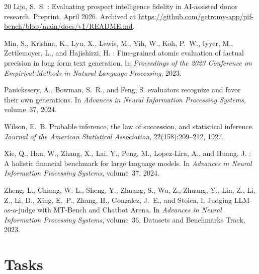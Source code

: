 \documentclass[11pt,a4paper]{article}
\begin{document}
\begin{thebibliography}{20}
Lijo, S.~S.
: Evaluating prospect intelligence fidelity in AI-assisted donor research.
\newblock Preprint, April 2026. Archived at \url{https://github.com/getromy-app/pif-bench/blob/main/docs/v1/README.md}.

Min, S., Krishna, K., Lyu, X., Lewis, M., Yih, W., Koh, P.~W., Iyyer, M., Zettlemoyer, L., and Hajishirzi, H.
: Fine-grained atomic evaluation of factual precision in long form text generation.
\newblock In \emph{Proceedings of the 2023 Conference on Empirical Methods in Natural Language Processing}, 2023.

Panickssery, A., Bowman, S.~R., and Feng, S.
 evaluators recognize and favor their own generations.
\newblock In \emph{Advances in Neural Information Processing Systems}, volume~37, 2024.

Wilson, E.~B.
\newblock Probable inference, the law of succession, and statistical inference.
\newblock \emph{Journal of the American Statistical Association}, 22(158):209--212, 1927.

Xie, Q., Han, W., Zhang, X., Lai, Y., Peng, M., Lopez-Lira, A., and Huang, J.
: A holistic financial benchmark for large language models.
\newblock In \emph{Advances in Neural Information Processing Systems}, volume~37, 2024.

Zheng, L., Chiang, W.-L., Sheng, Y., Zhuang, S., Wu, Z., Zhuang, Y., Lin, Z., Li, Z., Li, D., Xing, E.~P., Zhang, H., Gonzalez, J.~E., and Stoica, I.
\newblock Judging {LLM}-as-a-judge with {MT-Bench} and {Chatbot Arena}.
\newblock In \emph{Advances in Neural Information Processing Systems}, volume~36, Datasets and Benchmarks Track, 2023.

\end{thebibliography}

\clearpage
\appendix

\section{Tasks}
\label{app:tasks}
\end{document}
